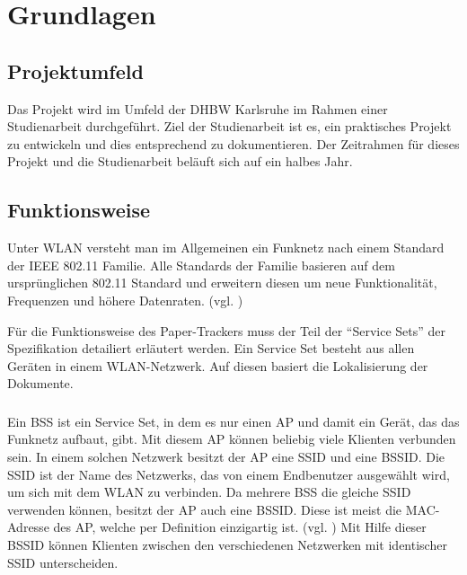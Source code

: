 \chapter{Grundlagen}

\section{Projektumfeld}

Das Projekt wird im Umfeld der \gls{DHBW} Karlsruhe im Rahmen einer Studienarbeit durchgeführt.
Ziel der Studienarbeit ist es, ein praktisches Projekt zu entwickeln und dies entsprechend zu dokumentieren.
Der Zeitrahmen für dieses Projekt und die Studienarbeit beläuft sich auf ein halbes Jahr.

\section{Funktionsweise } \label{sec:grundlagen-wlan}

Unter \gls{WLAN} versteht man im Allgemeinen ein Funknetz nach einem Standard der \gls{IEEE} 802.11 Familie.
Alle Standards der Familie basieren auf dem ursprünglichen 802.11 Standard und erweitern diesen um neue Funktionalität, Frequenzen und höhere Datenraten.
(vgl. \cite{Schnabel2020})

Für die Funktionsweise des Paper-Trackers muss der Teil der \enquote{Service Sets} der Spezifikation detailiert erläutert werden.
Ein Service Set besteht aus allen Geräten in einem \gls{WLAN}-Netzwerk.
Auf diesen basiert die Lokalisierung der Dokumente.

\subsection{}

Ein \gls{BSS} ist ein Service Set, in dem es nur einen \gls{AP} und damit ein Gerät, das das Funknetz aufbaut, gibt.
Mit diesem \gls{AP} können beliebig viele Klienten verbunden sein.
In einem solchen Netzwerk besitzt der \gls{AP} eine \gls{SSID} und eine \gls{BSSID}.
Die \gls{SSID} ist der Name des Netzwerks, das von einem Endbenutzer ausgewählt wird, um sich mit dem \gls{WLAN} zu verbinden.
Da mehrere \gls{BSS} die gleiche \gls{SSID} verwenden können, besitzt der \gls{AP} auch eine \gls{BSSID}.
Diese ist meist die \gls{MAC}-Adresse des \gls{AP}, welche per Definition einzigartig ist.
(vgl. \cite{Luber2018})
Mit Hilfe dieser \gls{BSSID} können Klienten zwischen den verschiedenen Netzwerken mit identischer \gls{SSID} unterscheiden.

